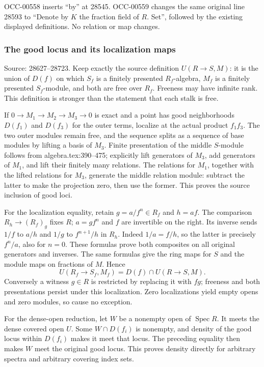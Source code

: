 OCC-00558 inserts ``by'' at 28545. OCC-00559 changes the same original line 28593 to ``Denote by \(K\) the fraction field of \(R\). Set'', followed by the existing displayed definitions. No relation or map changes.

\subsubsection{The good locus and its localization maps}\label{algebra-proof-027-the-good-locus-and-its-localization-maps}

Source: 28627--28723. Keep exactly the source definition \(U(R\to S,M)\): it is the union of \(D(f)\) on which \(S_f\) is a finitely presented \(R_f\)-algebra, \(M_f\) is a finitely presented \(S_f\)-module, and both are free over \(R_f\). Freeness may have infinite rank. This definition is stronger than the statement that each stalk is free.

If \(0\to M_1\to M_2\to M_3\to0\) is exact and a point has good neighborhoods \(D(f_1)\) and \(D(f_3)\) for the outer terms, localize at the actual product \(f_1f_3\). The two outer modules remain free, and the sequence splits as a sequence of base modules by lifting a basis of \(M_3\). Finite presentation of the middle \(S\)-module follows from algebra.tex:390--475; explicitly lift generators of \(M_3\), add generators of \(M_1\), and lift their finitely many relations. The relations for \(M_1\), together with the lifted relations for \(M_3\), generate the middle relation module: subtract the latter to make the projection zero, then use the former. This proves the source inclusion of good loci.

For the localization equality, retain \(g=a/f^n\in R_f\) and \(h=af\). The comparison \(R_h\to(R_f)_g\) fixes \(R\); \(a=g f^n\) and \(f\) are invertible on the right. Its inverse sends \(1/f\) to \(a/h\) and \(1/g\) to \(f^{n+1}/h\) in \(R_h\). Indeed \(1/a=f/h\), so the latter is precisely \(f^n/a\), also for \(n=0\). These formulas prove both composites on all original generators and inverses. The same formulas give the ring maps for \(S\) and the module maps on fractions of \(M\). Hence \[
 U(R_f\to S_f,M_f)=D(f)\cap U(R\to S,M).
\] Conversely a witness \(g\in R\) is restricted by replacing it with \(fg\); freeness and both presentations persist under this localization. Zero localizations yield empty opens and zero modules, so cause no exception.

For the dense-open reduction, let \(W\) be a nonempty open of \(\operatorname{Spec}R\). It meets the dense covered open \(U\). Some \(W\cap D(f_i)\) is nonempty, and density of the good locus within \(D(f_i)\) makes it meet that locus. The preceding equality then makes \(W\) meet the original good locus. This proves density directly for arbitrary spectra and arbitrary covering index sets.

